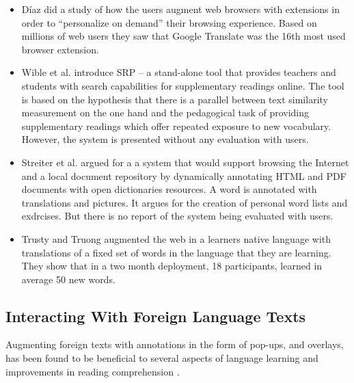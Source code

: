 \begin{itemize}
	\item D\'iaz \cite{Diaz15-Augmented} did a study of how the users augment web browsers with extensions in order to ``personalize on demand'' their browsing experience. Based on millions of web users they saw that Google Translate was the 16th most used browser extension.


	\item Wible et al. \cite{Wible01-Exposure} introduce SRP -- a stand-alone tool that provides teachers and students with search capabilities for supplementary readings online.
	The tool 
	is based on the hypothesis that there is a parallel between text similarity measurement on the one hand and the pedagogical task of providing supplementary readings which offer repeated exposure to new vocabulary.
	However, the system is presented without any evaluation with users.

	\item Streiter et al. \cite{Streit05-Browsers} argued for a a system that would support browsing the Internet and a local document repository by dynamically annotating HTML and PDF documents with open dictionaries resources. A word is annotated with translations and pictures. It argues for the creation of personal word lists and exdrcises. But there is no report of the system being evaluated with users. 

	\item Trusty and Truong augmented the web in a learners native language with translations of a fixed set of words in the language that they are learning\cite{Trus11web}. They show that in a two month deployment, 18 participants, learned in average 50 new words.

\end{itemize}


\subsection{Interacting With Foreign Language Texts}

Augmenting foreign texts with annotations in the form of pop-ups, and overlays, has been found to be beneficial to several aspects of language learning \cite{DeRidder02-Links} and improvements in reading comprehension \cite{Sanko06-Effects}.


